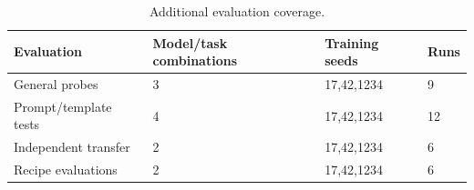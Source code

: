 \begin{table}[t]
\centering\small
\begin{tabular}{llll}
\toprule
Evaluation & Model/task combinations & Training seeds & Runs \\
\midrule
General probes & 3 & 17,42,1234 & 9 \\
Prompt/template tests & 4 & 17,42,1234 & 12 \\
Independent transfer & 2 & 17,42,1234 & 6 \\
Recipe evaluations & 2 & 17,42,1234 & 6 \\
\bottomrule
\end{tabular}
\caption{Additional evaluation coverage.}
\label{tab:paper-finish-protocol}
\end{table}
